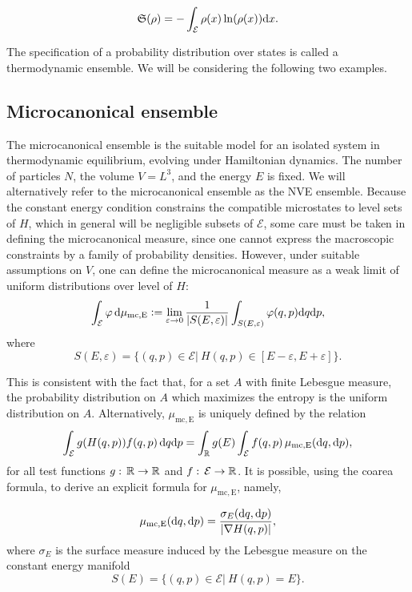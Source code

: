 \begin{equation}
    \label{eq:entropy}
    \mathfrak S(\rho)=-\int_{\mathcal E} \rho(x)\ln(\rho(x))\mathrm{d}x.
\end{equation}

The specification of a probability distribution over states is called a thermodynamic ensemble. We will be considering the following two examples.

\subsection{Microcanonical ensemble}

    The microcanonical ensemble is the suitable model for an isolated system in thermodynamic equilibrium, evolving under Hamiltonian dynamics. The number of particles $N$, the volume $V=L^3$, and the energy $E$ is fixed. We will alternatively refer to the microcanonical ensemble as the NVE ensemble.
     Because the constant energy condition constrains the compatible microstates to level sets of $H$, which in general will be negligible subsets of $\mathcal E$, some care must be taken in defining the microcanonical measure, since one cannot express the macroscopic constraints by a family of probability densities.
      However, under suitable assumptions on $V$, one can define the microcanonical measure as a weak limit of uniform distributions over level  of $H$:
    $$\int_\mathcal{E} \varphi\, \mathrm{d}\mu_{\mathrm{mc,E}} \mathrel{\mathop:}= \underset{\varepsilon \to 0}{\mathrm{lim}}\, \frac{1}{|S(E,\varepsilon)|}\int_{S(E,\varepsilon)} \varphi(q,p) \mathrm{d} q \mathrm{d} p,$$
    where 
    $$S(E,\varepsilon) = \{ (q,p) \in \mathcal E |\ H(q,p) \in [E-\varepsilon,E+\varepsilon]\}.$$
    
    This is consistent with the fact that, for a set $A$ with finite Lebesgue measure, the probability distribution on $A$ which maximizes the entropy is the uniform distribution on $A$. 
    Alternatively, $\mu_{\mathrm{mc,E}}$ is uniquely defined by the relation
    \[\int_{\mathcal E}g(H(q,p))f(q,p)\,\mathrm{d}q\mathrm{d}p=\int_{\mathbb{R}}g(E)\int_{\mathcal E} f(q,p)\,\mu_{\mathrm{mc,E}}(\mathrm{d} q,\mathrm{d}p),\]
    for all test functions $g:\,\mathbb{R}\to \mathbb{R}$ and $f:\,\mathcal E\to \mathbb{R}$.
    It is possible, using the coarea formula, to derive an explicit formula for $\mu_{\mathrm{mc,E}}$, namely,

    \begin{equation}
        \label{eq:microcanonical_measure}
        \mu_{\mathrm{mc,E}}(\mathrm{d} q,\mathrm{d} p)=\frac{\sigma_{E}(\mathrm{d} q,\mathrm{d} p)}{|\nabla H(q,p)|},
    \end{equation}
    where $\sigma_{E}$ is the surface measure induced by the Lebesgue measure on the constant energy manifold
    \begin{equation}
        \label{eq:constant_energy_manifold}
        S(E) = \{ (q,p) \in \mathcal E |\ H(q,p) = E\}.\end{equation}


